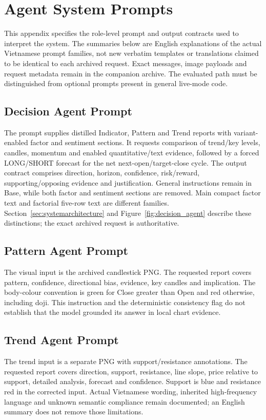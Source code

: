 \FloatBarrier
\appendix
\section{Agent System Prompts}
\label{app:prompts}
This appendix specifies the role-level prompt and output contracts used to interpret the system. The summaries below are English explanations of the actual Vietnamese prompt families, not new verbatim templates or translations claimed to be identical to each archived request. Exact messages, image payloads and request metadata remain in the companion archive. The evaluated path must be distinguished from optional prompts present in general live-mode code.

\subsection{Decision Agent Prompt}
\label{app:prompt_decision}
The prompt supplies distilled Indicator, Pattern and Trend reports with variant-enabled factor and sentiment sections. It requests comparison of trend/key levels, candles, momentum and enabled quantitative/text evidence, followed by a forced LONG/SHORT forecast for the net next-open/target-close cycle. The output contract comprises direction, horizon, confidence, risk/reward, supporting/opposing evidence and justification. General instructions remain in Base, while both factor and sentiment sections are removed. Main compact factor text and factorial five-row text are different families. Section~\ref{sec:systemarchitecture} and Figure~\ref{fig:decision_agent} describe these distinctions; the exact archived request is authoritative.

\subsection{Pattern Agent Prompt}
\label{app:prompt_pattern}
The visual input is the archived candlestick PNG. The requested report covers pattern, confidence, directional bias, evidence, key candles and implication. The body-colour convention is green for Close greater than Open and red otherwise, including doji. This instruction and the deterministic consistency flag do not establish that the model grounded its answer in local chart evidence.

\subsection{Trend Agent Prompt}
\label{app:prompt_trend}
The trend input is a separate PNG with support/resistance annotations. The requested report covers direction, support, resistance, line slope, price relative to support, detailed analysis, forecast and confidence. Support is blue and resistance red in the corrected input. Actual Vietnamese wording, inherited high-frequency language and unknown semantic compliance remain documented; an English summary does not remove those limitations.


